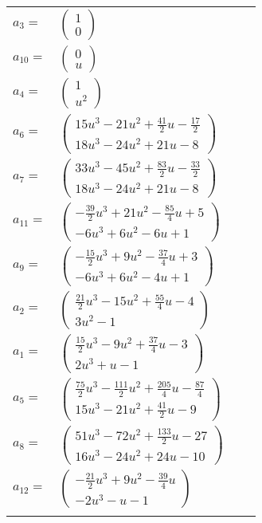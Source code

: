 \documentclass[1p]{elsarticle_modified}
\theoremstyle{definition}
\begin{document}
\begin{tabular}{m{7pt} m{180pt} m{7pt} m{180pt} }
\flushright $a_{3}=$&$\begin{pmatrix}1\\0\end{pmatrix}$ \\
\flushright $a_{10}=$&$\begin{pmatrix}0\\u\end{pmatrix}$ \\
\flushright $a_{4}=$&$\begin{pmatrix}1\\u^2\end{pmatrix}$ \\
\flushright $a_{6}=$&$\begin{pmatrix}15 u^3-21 u^2+\frac{41}{2} u-\frac{17}{2}\\18 u^3-24 u^2+21 u-8\end{pmatrix}$ \\
\flushright $a_{7}=$&$\begin{pmatrix}33 u^3-45 u^2+\frac{83}{2} u-\frac{33}{2}\\18 u^3-24 u^2+21 u-8\end{pmatrix}$ \\
\flushright $a_{11}=$&$\begin{pmatrix}-\frac{39}{2} u^3+21 u^2-\frac{85}{4} u+5\\-6 u^3+6 u^2-6 u+1\end{pmatrix}$ \\
\flushright $a_{9}=$&$\begin{pmatrix}-\frac{15}{2} u^3+9 u^2-\frac{37}{4} u+3\\-6 u^3+6 u^2-4 u+1\end{pmatrix}$ \\
\flushright $a_{2}=$&$\begin{pmatrix}\frac{21}{2} u^3-15 u^2+\frac{55}{4} u-4\\3 u^2-1\end{pmatrix}$ \\
\flushright $a_{1}=$&$\begin{pmatrix}\frac{15}{2} u^3-9 u^2+\frac{37}{4} u-3\\2 u^3+u-1\end{pmatrix}$ \\
\flushright $a_{5}=$&$\begin{pmatrix}\frac{75}{2} u^3-\frac{111}{2} u^2+\frac{205}{4} u-\frac{87}{4}\\15 u^3-21 u^2+\frac{41}{2} u-9\end{pmatrix}$ \\
\flushright $a_{8}=$&$\begin{pmatrix}51 u^3-72 u^2+\frac{133}{2} u-27\\16 u^3-24 u^2+24 u-10\end{pmatrix}$ \\
\flushright $a_{12}=$&$\begin{pmatrix}-\frac{21}{2} u^3+9 u^2-\frac{39}{4} u\\-2 u^3- u-1\end{pmatrix}$\\&\end{tabular}
\end{document}
